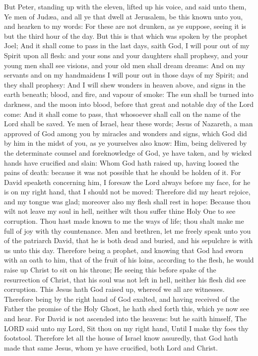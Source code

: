 But Peter, standing up with the eleven, lifted up his
voice, and said unto them, Ye men of Judæa, and all ye that dwell at
Jerusalem, be this known unto you, and hearken to my words:
 For these are not drunken, as ye suppose, seeing it is but
the third hour of the day.  But this is that which was
spoken by the prophet Joel;  And it shall come to pass in
the last days, saith God, I will pour out of my Spirit upon all flesh:
and your sons and your daughters shall prophesy, and your young men
shall see visions, and your old men shall dream dreams: 
And on my servants and on my handmaidens I will pour out in those days
of my Spirit; and they shall prophesy:  And I will shew
wonders in heaven above, and signs in the earth beneath; blood, and
fire, and vapour of smoke:  The sun shall be turned into
darkness, and the moon into blood, before that great and notable day of
the Lord come:  And it shall come to pass, that whosoever
shall call on the name of the Lord shall be saved.  Ye men
of Israel, hear these words; Jesus of Nazareth, a man approved of God
among you by miracles and wonders and signs, which God did by him in the
midst of you, as ye yourselves also know:  Him, being
delivered by the determinate counsel and foreknowledge of God, ye have
taken, and by wicked hands have crucified and slain:  Whom
God hath raised up, having loosed the pains of death: because it was not
possible that he should be holden of it.  For David
speaketh concerning him, I foresaw the Lord always before my face, for
he is on my right hand, that I should not be moved: 
Therefore did my heart rejoice, and my tongue was glad; moreover also my
flesh shall rest in hope:  Because thou wilt not leave my
soul in hell, neither wilt thou suffer thine Holy One to see corruption.
 Thou hast made known to me the ways of life; thou shalt
make me full of joy with thy countenance.  Men and
brethren, let me freely speak unto you of the patriarch David, that he
is both dead and buried, and his sepulchre is with us unto this day.
 Therefore being a prophet, and knowing that God had sworn
with an oath to him, that of the fruit of his loins, according to the
flesh, he would raise up Christ to sit on his throne;  He
seeing this before spake of the resurrection of Christ, that his soul
was not left in hell, neither his flesh did see corruption.
 This Jesus hath God raised up, whereof we all are
witnesses.  Therefore being by the right hand of God
exalted, and having received of the Father the promise of the Holy
Ghost, he hath shed forth this, which ye now see and hear. 
For David is not ascended into the heavens: but he saith himself, The
LORD said unto my Lord, Sit thou on my right hand,  Until I
make thy foes thy footstool.  Therefore let all the house
of Israel know assuredly, that God hath made that same Jesus, whom ye
have crucified, both Lord and Christ.

